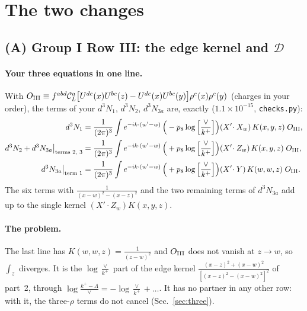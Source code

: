 \documentclass[10pt]{article}
\numberwithin{equation}{section}
\newcommand{\CL}{\mathcal C_L}
\newcommand{\Lv}{\log\Big[\frac{\vee}{k^+}\Big]}
\newcommand{\pre}{\frac{1}{(2\pi)^3}}
\newcommand{\phw}{e^{-ik\cdot(w'-w)}}
\begin{document}
\section{The two changes}\label{sec:changes}
\subsection{(A) Group I Row III: the edge kernel and \texorpdfstring{$\mathcal D$}{D}}\label{sec:A}
\paragraph{Your three equations in one line.} With $O_{\rm III}\equiv f^{abd}\CL^a\big[U^{de}(x)U^{bc}(z)-U^{de}(x)U^{bc}(y)\big]\rho^e(x)\rho^c(y)$ (charges in your order), the terms of your $d^3N_1$, $d^3N_2$, $d^3N_{3a}$ are, exactly ($1.1\times10^{-15}$, \texttt{checks.py}):
\begin{align}
d^3N_1&=\pre\int\phw\,\Big(-p_8\Lv\Big)(X'\!\cdot X_w)\,K(x,y,z)\;O_{\rm III},\notag\\
d^3N_2+d^3N_{3a}\big|_{\text{terms 2, 3}}&=\pre\int\phw\,\Big(+p_8\Lv\Big)(X'\!\cdot Z_w)\,K(x,y,z)\;O_{\rm III},\notag\\
d^3N_{3a}\big|_{\text{term 1}}&=\pre\int\phw\,\Big(+p_8\Lv\Big)(X'\!\cdot Y)\,K(w,w,z)\;O_{\rm III}.
\label{eq:G1III}
\end{align}
The six terms with $\frac{1}{(x-w)^2-(x-z)^2}$ and the two remaining terms of $d^3N_{3a}$ add up to the single kernel $(X'\!\cdot Z_w)K(x,y,z)$.

\paragraph{The problem.} The last line has $K(w,w,z)=\frac1{(z-w)^2}$ and $O_{\rm III}$ does not vanish at $z\to w$, so $\int_z$ diverges. It is the $\log\frac{\vee}{k^+}$ part of the edge kernel $\frac{(x-z)^2+(x-w)^2}{[(x-z)^2-(x-w)^2]^2}$ of part~2, through $\log\frac{k^+-\Lambda}{\vee}=-\log\frac{\vee}{k^+}+\dots$. It has no partner in any other row: with it, the three-$\rho$ terms do not cancel (Sec.~\ref{sec:three}).
\end{document}
